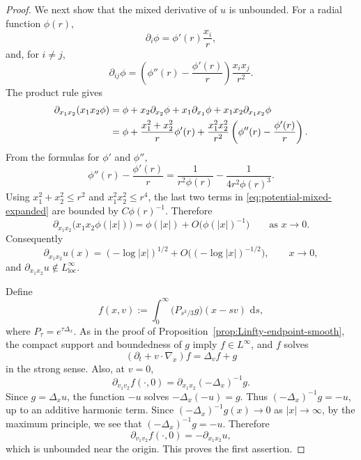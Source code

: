 \documentclass[11pt,reqno]{amsart}
\numberwithin{equation}{section}
\theoremstyle{remark}
\newcommand{\dd}{\,\mathrm{d}}
\begin{document}
\begin{proof}
We next show that the mixed {derivative} of \(u\) is unbounded.  For a radial
function \(\phi(r)\),
\[
   \partial_i\phi=\phi'(r)\frac{x_i}{r},
\]
and, for \(i\ne j\),
\[
   \partial_{ij}\phi
   =\left(\phi''(r)-\frac{\phi'(r)}{r}\right)\frac{x_ix_j}{r^2}.
\]
The product rule gives
\begin{align}
   \partial_{x_1x_2}(x_1x_2\phi)
   &=\phi
     +x_2\partial_{x_2}\phi
     +x_1\partial_{x_1}\phi
     +x_1x_2\partial_{x_1x_2}\phi \notag \\
   &=\phi
     +\frac{x_1^2+x_2^2}{r}\phi'(r)
     +\frac{x_1^2x_2^2}{r^2}
       \left(\phi''(r)-\frac{\phi'(r)}{r}\right).
   \label{eq:potential-mixed-expanded}
\end{align}
From the formulas for \(\phi'\) and \(\phi''\),
\[
   \phi''(r)-\frac{\phi'(r)}{r}
   =\frac{1}{r^2\phi(r)}-
     \frac{1}{4r^2\phi(r)^3}.
\]
Using \(x_1^2+x_2^2\le r^2\) and \(x_1^2x_2^2\le r^4\), the last two
terms in \eqref{eq:potential-mixed-expanded} are bounded by \(C\phi(r)^{-1}\).
Therefore
\begin{equation}\label{eq:potential-mixed-unbounded}
   \partial_{x_1x_2}\big(x_1x_2\phi(|x|)\big)
   =\phi(|x|)+O\big(\phi(|x|)^{-1}\big)
   \qquad\text{as }x\to0.
\end{equation}
Consequently
\[
   \partial_{x_1x_2}u(x)
   =(-\log|x|)^{1/2}+O\big((-\log|x|)^{-1/2}\big),
   \qquad x\to0,
\]
and \(\partial_{x_1x_2}u\notin L^\infty_{\mathrm{loc}}\).

Define
\begin{equation}\label{eq:potential-f-def}
   f(x,v):=\int_0^\infty \big(P_{s^3/3}g\big)(x-sv)\,\dd s,
\end{equation}
where \(P_\tau=e^{\tau\Delta_x}\).  As in the proof of
Proposition~\ref{prop:Linfty-endpoint-smooth}, the compact support and boundedness
of \(g\) imply \(f\in L^\infty\), and \(f\) solves
\[
   (\partial_t+v\cdot\nabla_x)f=\Delta_vf+g
\]
{in the strong sense}.  Also, at \(v=0\),
\[
   \partial_{v_1v_2}f(\cdot,0)
   =\partial_{x_1x_2}(-\Delta_x)^{-1}g.
\]
Since \(g=\Delta_xu\), the function \(-u\) solves
\(-\Delta_x(-u)=g\).  Thus \((-\Delta_x)^{-1}g=-u\), up to an additive
harmonic term. {Since $(-\Delta_x)^{-1}g(x)\to 0$ as $|x|\to \infty$, by the maximum principle, we see that \((-\Delta_x)^{-1}g=-u\).} %
Therefore
\[
   \partial_{v_1v_2}f(\cdot,0)=-\partial_{x_1x_2}u,
\]
which is unbounded near the origin.  This proves the first assertion. 


\end{proof}
\end{document}
